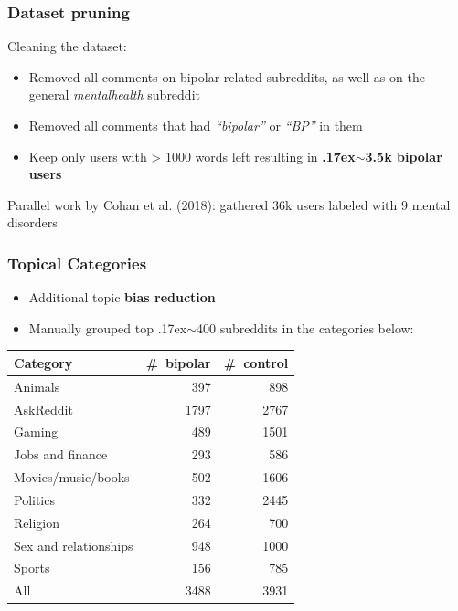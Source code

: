 \documentclass{beamer}
\begin{document}
\begin{frame}
  \frametitle{Dataset pruning}

  Cleaning the dataset:
  \begin{itemize}
    \item Removed all comments on bipolar-related subreddits, as well as on the general \textit{mentalhealth} subreddit
    \item Removed all comments that had \textit{``bipolar''} or \textit{``BP''} in them
    \item Keep only users with > 1000 words left resulting in \textbf{{\raise.17ex\hbox{$\scriptstyle\sim$}}3.5k bipolar users}
  \end{itemize}


\pause
Parallel work by Cohan et al. (2018): gathered 36k users labeled with 9 mental disorders


\end{frame}
\begin{frame}
  \frametitle{Topical Categories}
  \begin{itemize}
    \item Additional topic \textbf{bias reduction}
    \item Manually grouped top {\raise.17ex\hbox{$\scriptstyle\sim$}}400 subreddits in the categories below:
  \end{itemize}
\begin{table}
\centering
{\small
\begin{tabular}{lrr}
\toprule
Category            & \#~bipolar   & \#~control   \\
\midrule
Animals               & 397  & 898  \\
AskReddit             & 1797 & 2767 \\
Gaming                & 489  & 1501 \\
Jobs and finance      & 293  & 586  \\
Movies/music/books    & 502  & 1606 \\
Politics              & 332  & 2445 \\
Religion              & 264  & 700  \\
Sex and relationships & 948  & 1000 \\
Sports                & 156  & 785 \\
\midrule
All                   & 3488 & 3931 \\
\bottomrule
\end{tabular}}
\end{table}
\end{frame}
\end{document}

